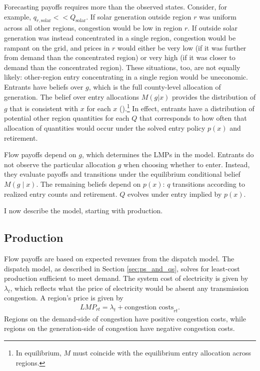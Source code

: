 \documentclass[12pt]{article}
\begin{document}
Forecasting payoffs requires more than the observed states. Consider, for example, $q_{r,\mathrm{solar}} << Q_{\mathrm{solar}}$. If solar generation outside region $r$ was uniform across all other regions, congestion would be low in region $r$. If outside solar generation was instead concentrated in a single region, congestion would be rampant on the grid, and prices in $r$ would either be very low (if it was further from demand than the concentrated region) or very high (if it was closer to demand than the concentrated region). These situations, too, are not equally likely: other-region entry concentrating in a single region would be uneconomic. Entrants have beliefs over $g$, which is the full county-level allocation of generation. The belief over entry allocations $M(g | x)$ provides the distribution of $g$ that is consistent with $x$ for each $x$ (\cite{IfrachWeintraub2017}).\footnote{In equilibrium, $M$ must coincide with the equilibrium entry allocation across regions.} In effect, entrants have a distribution of potential other region quantities for each $Q$ that corresponds to how often that allocation of quantities would occur under the solved entry policy $p(x)$ and retirement. 

Flow payoffs depend on $g$, which determines the LMPs in the model. Entrants do not observe the particular allocation $g$ when choosing whether to enter. Instead, they evaluate payoffs and transitions under the equilibrium conditional belief $M(g\mid x)$. The remaining beliefs depend on $p(x)$: $q$ transitions according to realized entry counts and retirement. $Q$ evolves under entry implied by $p(x)$.

I now describe the model, starting with production.

\subsection{Production}

Flow payoffs are based on expected revenues from the dispatch model. The dispatch model, as described in Section \ref{sec:ps_and_qs}, solves for least-cost production sufficient to meet demand. The system cost of electricity is given by $\lambda_t$, which reflects what the price of electricity would be absent any transmission congestion. A region's price is given by 
\begin{align}
    LMP_{rt} = \lambda_t + \text{congestion costs}_{rt}.
\end{align} Regions on the demand-side of congestion have positive congestion costs, while regions on the generation-side of congestion have negative congestion costs. 
\end{document}
